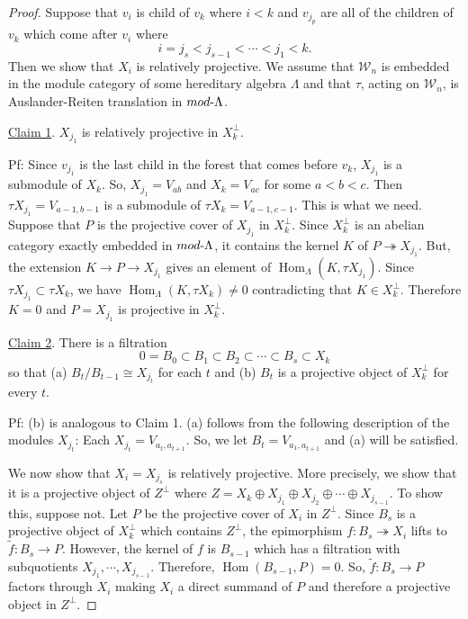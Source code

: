 \documentclass[11pt]{amsart}
\theoremstyle{definition}
\theoremstyle{remark}
\numberwithin{equation}{section}
\newcommand{\onto}{\twoheadrightarrow}
\DeclareMathOperator{\Hom}{Hom}%
\newcommand{\cW}{\ensuremath{{\mathcal{W}}}}
\begin{document}
\begin{proof} Suppose that $v_i$ is child of $v_k$ where $i<k$ and $v_{j_p}$ are all of the children of $v_k$ which come after $v_i$ where
\[
	i=j_s<j_{s-1}<\cdots<j_1<k.
\]
 Then we show that $X_i$ is relatively projective. We assume that $\cW_n$ is embedded in the module category of some hereditary algebra $\Lambda$ and that $\tau$, acting on $\cW_n$, is Auslander-Reiten translation in $mod\text-\Lambda$.

\underline{Claim 1}. $X_{j_1}$ is relatively projective in $X_k^\perp$.

Pf: Since $v_{j_1}$ is the last child in the forest that comes before $v_k$, $X_{j_1}$ is a submodule of $X_k$. So, $X_{j_1}=V_{ab}$ and $X_k=V_{ac}$ for some $a<b<c$. Then $\tau X_{j_1}=V_{a-1,b-1}$ is a submodule of $\tau X_k=V_{a-1,c-1}$. This is what we need. Suppose that $P$ is the projective cover of $X_{j_1}$ in $X_k^\perp$. Since $X_k^\perp$ is an abelian category exactly embedded in $mod\text-\Lambda$, it contains the kernel $K$ of $P\onto X_{j_1}$. But, the extension $K\to P\to X_{j_1}$ gives an element of $\Hom_\Lambda(K,\tau X_{j_1})$. Since $\tau X_{j_1}\subset \tau X_k$, we have $\Hom_\Lambda(K,\tau X_k)\neq0$ contradicting that $K\in X_k^\perp$. Therefore $K=0$ and $P=X_{j_1}$ is projective in $X_k^\perp$.

\underline{Claim 2}. There is a filtration
\[
	0=B_0\subset B_1\subset B_2\subset\cdots\subset B_s\subset X_k
\]
so that (a) $B_t/B_{t-1}\cong X_{j_t}$ for each $t$ and (b) $B_t$ is a projective object of $X_k^\perp$ for every $t$.

Pf: (b) is analogous to Claim 1. (a) follows from the following description of the modules $X_{j_t}$: Each $X_{j_t}=V_{a_t,a_{t+1}}$. So, we let $B_t=V_{a_1,a_{t+1}}$ and (a) will be satisfied.

We now show that $X_i=X_{j_s}$ is relatively projective. More precisely, we show that it is a projective object of $Z^\perp$ where $Z=X_k\oplus X_{j_1}\oplus X_{j_2}\oplus \cdots\oplus X_{j_{s-1}}$. To show this, suppose not. Let $P$ be the projective cover of $X_i$ in $Z^\perp$. Since $B_s$ is a projective object of $X_k^\perp$ which contains $Z^\perp$, the epimorphism $f: B_s\onto X_i$ lifts to $\tilde f:B_s\to P$. However, the kernel of $f$ is $B_{s-1}$ which has a filtration with subquotients $X_{j_1},\cdots,X_{j_{s-1}}$. Therefore, $\Hom(B_{s-1},P)=0$. So, $\tilde f:B_s\to P$ factors through $X_i$ making $X_i$ a direct summand of $P$ and therefore a projective object in $Z^\perp$.
\end{proof}
\end{document}

